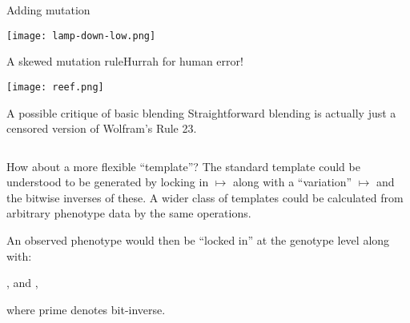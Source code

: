 \begin{frame}{Adding mutation}{}
\begin{center}
\texttt{[image: lamp-down-low.png]}
\end{center}
\end{frame}

\begin{frame}{A skewed mutation rule}{Hurrah for human error!}
\begin{center}
\texttt{[image: reef.png]}
\end{center}
\end{frame}

\begin{frame}[fragile]{A possible critique of basic blending}{}
Straightforward blending is actually just a censored version
of Wolfram's Rule 23.

\begin{columns}[onlytextwidth]
\begin{column}[T]{.2in}
\end{column}
%

\begin{column}[T]{1.6in}
\begin{fminipage}{1.6in}

\end{fminipage}
\end{column}

% 
\begin{column}[T]{2in}
\begin{fminipage}{1.6in}

\end{fminipage}
\end{column}

%
\begin{column}[T]{.05in}
\end{column}
%
\end{columns}

\end{frame}

\begin{frame}{How about a more flexible ``template''?}{}
The standard template could be understood to be generated by locking in
%
\boxed{0\mystrut}\boxed{0\mystrut}\boxed{0\mystrut} $\mapsto$ \boxed{0\mystrut}
%
along with a ``variation''
\boxed{0\mystrut}\boxed{1\mystrut}\boxed{0\mystrut} $\mapsto$
\boxed{0\mystrut} and the bitwise inverses of these.  A wider class of
templates could be calculated from arbitrary phenotype data by the same
operations. 

\medskip

An observed phenotype 
would then be ``locked in'' at the genotype level along with:

\smallskip
{\centering
{},
and
, \par}
\smallskip

where prime denotes bit-inverse.
\end{frame}

